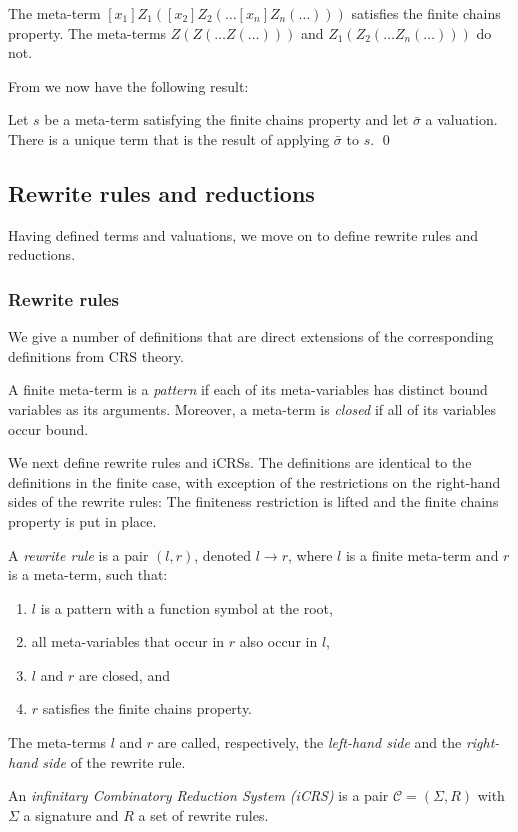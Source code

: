 \documentclass{LMCS}
\theoremstyle{plain}
\theoremstyle{definition}
\newcommand{\trsp}[3]{\mathcal{#1} = (#2, #3)}
\newcommand{\rew}{\rightarrow}
\begin{document}
\begin{exa}
\label{ex:chain}
The meta-term $[x_1]Z_1([x_2]Z_2(\ldots [x_n]Z_n(\ldots)))$ satisfies the finite chains property. The meta-terms $Z(Z(\ldots Z(\ldots)))$ and $Z_1(Z_2(\ldots Z_n(\ldots)))$ do not.
\end{exa}

From \cite{JJ05a} we now have the following result:
\begin{prop}
\label{prop:metasane}
Let $s$ be a meta-term satisfying the finite chains property and
let $\bar{\sigma}$ a valuation. There is a unique term that is the
result of applying $\bar{\sigma}$ to $s$. \qed
\end{prop}

\subsection{Rewrite rules and reductions}
\label{sec:rules}

Having defined terms and valuations, we move on to define rewrite rules and reductions.

\subsubsection{Rewrite rules}

We give a number of definitions that are direct extensions of the
corresponding definitions from CRS theory.

\begin{defi}
A finite meta-term is a \emph{pattern} if each of its meta-variables has distinct bound variables as its arguments. Moreover, a meta-term is \emph{closed} if all of its variables occur bound.
\end{defi}

We next define rewrite rules and iCRSs. The definitions are identical to the definitions in the finite case, with exception of the restrictions on the right-hand sides of the rewrite rules: The finiteness restriction is lifted and the finite chains property is put in place. 
\begin{defi}
A \emph{rewrite rule} is a pair $(l, r)$, denoted $l \rew r$, where $l$ is a finite meta-term and $r$ is a meta-term, such that:
\begin{enumerate}[(1)]
\item
$l$ is a pattern with a function symbol at the root,
\item
all meta-variables that occur in $r$ also occur in $l$, 
\item
$l$ and $r$ are closed, and
\item
$r$ satisfies the finite chains property.
\end{enumerate}
The meta-terms $l$ and $r$ are called, respectively, the \emph{left-hand side}
and the \emph{right-hand side} of the rewrite rule.

An \emph{infinitary Combinatory Reduction System (iCRS)} is a pair
$\trsp{C}{\Sigma}{R}$ with $\Sigma$ a signature and $R$ a set of rewrite rules.
\end{defi}
\end{document}
